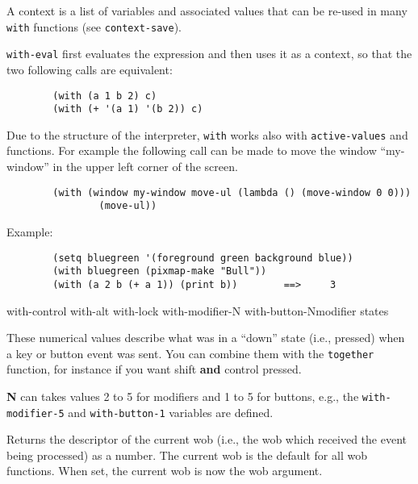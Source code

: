 A context is a list of variables and associated values that can be re-used
in many \verb"with" functions (see \verb"context-save").

\verb"with-eval" first evaluates the expression and then uses it as a
context, so that the two following calls are equivalent:

{\exemplefont\begin{verbatim}
        (with (a 1 b 2) c)
        (with (+ '(a 1) '(b 2)) c)
\end{verbatim}}

Due to the structure of the {\WOOL} interpreter, \verb"with" works also with
\verb"active-values" and functions. 
For example the following call can be made to
move the window ``my-window'' in the upper left corner of the screen.

{\exemplefont\begin{verbatim}
        (with (window my-window move-ul (lambda () (move-window 0 0)))
                (move-ul))
\end{verbatim}} 

Example: {\exemplefont\upspace\begin{verbatim}
        (setq bluegreen '(foreground green background blue))
        (with bluegreen (pixmap-make "Bull"))
        (with (a 2 b (+ a 1)) (print b))        ==>     3
\end{verbatim}}

        {with-control}
        {with-alt}
        {with-lock}
        {with-modifier-N}
        {with-button-N}{modifier states}
        

These numerical values describe what was in a ``down'' state (i.e., pressed)
when a key or button event was sent. You can combine them with the
\verb"together" function, for instance if you want shift {\bf and} control 
pressed.

{\bf N} can takes values 2 to 5 for modifiers and 1 to 5 for buttons, e.g.,
the \verb"with-modifier-5" and \verb"with-button-1" variables are defined.

        

Returns the descriptor of the current wob (i.e., the wob which received the
event being processed) as a {\WOOL} number.  The current wob is the default for
all wob functions.  When set, the current wob is now the wob argument.

